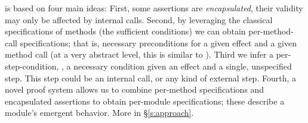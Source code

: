 { %
 
\Nec {} is based on four main ideas: 
First, some assertions are \emph{encapsulated}, \ie
their validity may only be affected by internal calls. 
Second, by leveraging the classical  specifications of methods 
(\ie the sufficient conditions) we can obtain per-method-call
 \Nec specifications; that is, necessary preconditions
  for a given effect and a given method call (at a very abstract level, this is
similar to ).
Third we infer a per-step-condition, \ie, a necessary condition given an effect and a single, unspecified step. This step could be an internal call, or any kind of external step.
Fourth,  a novel proof system allows us to combine 
per-method \Nec specifications and encapsulated assertions 
 to obtain per-module   \Nec specifications; these describe a module's
 emergent behavior.
More in \S\ref{s:approach}.
 
}
